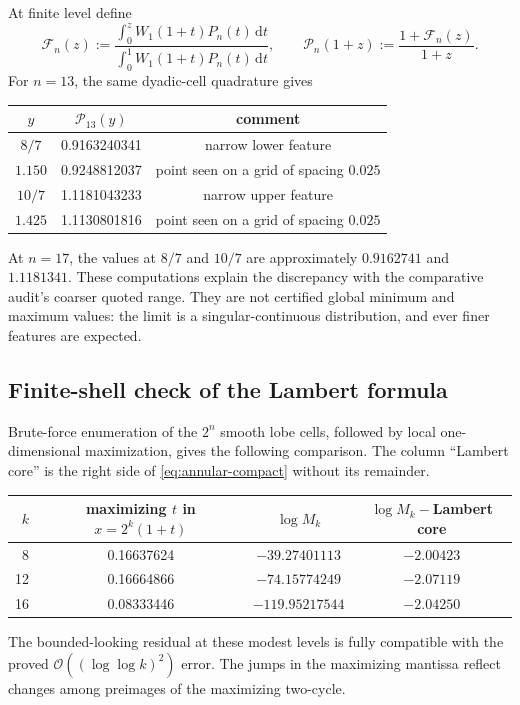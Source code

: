 \documentclass[11pt,oneside]{article}
\theoremstyle{definition}
\theoremstyle{remark}
\newcommand{\dd}{\,\mathrm d}
\newcommand{\bigO}{\mathcal O}
\begin{document}
At finite level define
\begin{equation}
 \mathscr F_n(z):=
 \frac{\int_0^zW_1(1+t)P_n(t)\dd t}
      {\int_0^1W_1(1+t)P_n(t)\dd t},
 \qquad
 \mathscr P_n(1+z):=\frac{1+\mathscr F_n(z)}{1+z}.
 \label{eq:finite-profile}
\end{equation}
For $n=13$, the same dyadic-cell quadrature gives
\begin{center}
\begin{tabular}{@{}ccc@{}}
\toprule
$y$ & $\mathscr P_{13}(y)$ & comment\\
\midrule
$8/7$  & 0.9163240341 & narrow lower feature\\
$1.150$ & 0.9248812037 & point seen on a grid of spacing $0.025$\\
$10/7$ & 1.1181043233 & narrow upper feature\\
$1.425$ & 1.1130801816 & point seen on a grid of spacing $0.025$\\
\bottomrule
\end{tabular}
\end{center}
At $n=17$, the values at $8/7$ and $10/7$ are approximately
$0.9162741$ and $1.1181341$.  These computations explain the discrepancy with
the comparative audit's coarser quoted range.  They are not certified global
minimum and maximum values: the limit is a singular-continuous distribution,
and ever finer features are expected.

\subsection{Finite-shell check of the Lambert formula}

Brute-force enumeration of the $2^n$ smooth lobe cells, followed by local
one-dimensional maximization, gives the following comparison.  The column
``Lambert core'' is the right side of \eqref{eq:annular-compact} without its
remainder.

\begin{center}
\begin{tabular}{@{}rccc@{}}
\toprule
$k$ & maximizing $t$ in $x=2^k(1+t)$ & $\log M_k$ &
$\log M_k-$Lambert core\\
\midrule
8  & 0.16637624 & $-39.27401113$  & $-2.00423$\\
12 & 0.16664866 & $-74.15774249$  & $-2.07119$\\
16 & 0.08333446 & $-119.95217544$ & $-2.04250$\\
\bottomrule
\end{tabular}
\end{center}
The bounded-looking residual at these modest levels is fully compatible with
the proved $\bigO((\log\log k)^2)$ error.  The jumps in the maximizing
mantissa reflect changes among preimages of the maximizing two-cycle.
\end{document}
